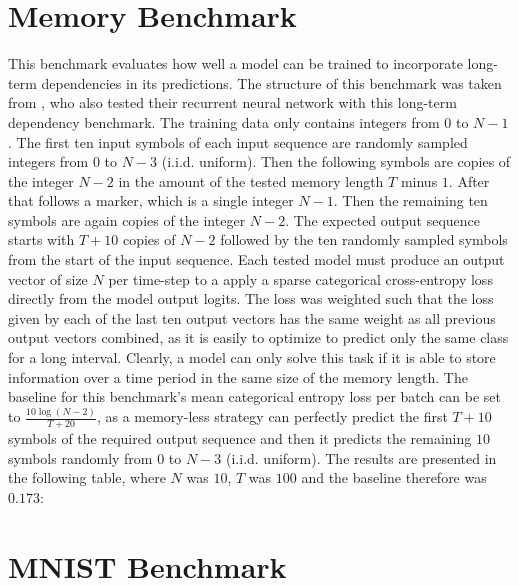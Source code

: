\documentclass[draft,final]{vutinfth} %
\begin{document}
    \section{Memory Benchmark}
    This benchmark evaluates how well a model can be trained to incorporate long-term dependencies in its predictions.
    The structure of this benchmark was taken from \cite{UnitaryRNNs}, who also tested their recurrent neural network with this long-term dependency benchmark.
    The training data only contains integers from $0$ to $N-1$. The first ten input symbols of each input sequence are randomly sampled integers from $0$ to $N-3$ (i.i.d. uniform).
    Then the following symbols are copies of the integer $N-2$ in the amount of the tested memory length $T$ minus $1$.
    After that follows a marker, which is a single integer $N-1$.
    Then the remaining ten symbols are again copies of the integer $N-2$.
    The expected output sequence starts with $T+10$ copies of $N-2$ followed by the ten randomly sampled symbols from the start of the input sequence.
    Each tested model must produce an output vector of size $N$ per time-step to a apply a sparse categorical cross-entropy loss directly from the model output logits.
    The loss was weighted such that the loss given by each of the last ten output vectors has the same weight as all previous output vectors combined, as it is easily to optimize to predict only the same class for a long interval.
    Clearly, a model can only solve this task if it is able to store information over a time period in the same size of the memory length.
    The baseline for this benchmark's mean categorical entropy loss per batch can be set to $\frac{10\log(N-2)}{T+20}$, as a memory-less strategy can perfectly predict the first $T+10$ symbols of the required output sequence and then it predicts the remaining $10$ symbols randomly from $0$ to $N-3$ (i.i.d. uniform).
    The results are presented in the following table, where $N$ was $10$, $T$ was $100$ and the baseline therefore was $0.173$:

    \section{MNIST Benchmark}
\end{document}
